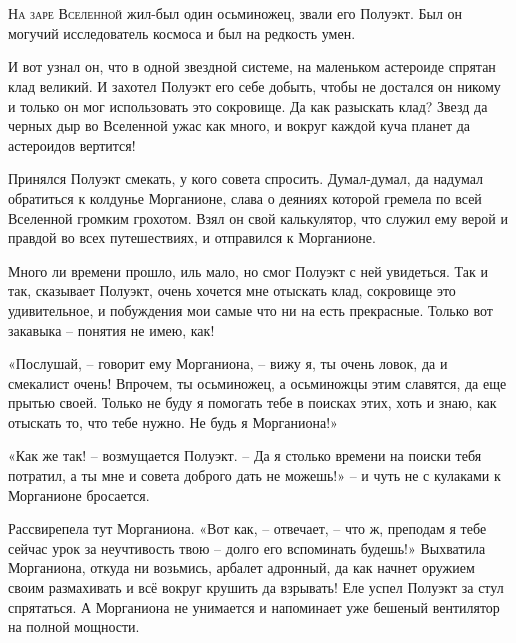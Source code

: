 \documentclass[ebook,oneside,final,openright]{memoir}
\begin{document}
\chapter{}
 \lettrine{Н}{а заре Вселенной} жил-был один осьминожец, звали его Полуэкт. Был он могучий исследователь космоса и был на редкость умен.\par
\par
И вот узнал он, что в одной звездной системе, на маленьком астероиде спрятан клад великий. И захотел Полуэкт его себе добыть, чтобы не достался он никому и только он мог использовать это сокровище. Да как разыскать клад? Звезд да черных дыр во Вселенной ужас как много, и вокруг каждой куча планет да астероидов вертится!\par
\par
Принялся Полуэкт смекать, у кого совета спросить. Думал-думал, да надумал обратиться к колдунье Морганионе, слава о деяниях которой гремела по всей Вселенной громким грохотом. Взял он свой калькулятор, что служил ему верой и правдой во всех путешествиях, и отправился к Морганионе.\par
\par
Много ли времени прошло, иль мало, но смог Полуэкт с ней увидеться. Так и так, сказывает Полуэкт, очень хочется мне отыскать клад, сокровище это удивительное, и побуждения мои самые что ни на есть прекрасные. Только вот закавыка – понятия не имею, как!\par
\par
«Послушай, – говорит ему Морганиона, – вижу я, ты очень ловок, да и смекалист очень! Впрочем, ты осьминожец, а осьминожцы этим славятся, да еще прытью своей. Только не буду я помогать тебе в поисках этих, хоть и знаю, как отыскать то, что тебе нужно. Не будь я Морганиона!» \par
\par
«Как же так! – возмущается Полуэкт. – Да я столько времени на поиски тебя потратил, а ты мне и совета доброго дать не можешь!» – и чуть не с кулаками к Морганионе бросается. \par
\par
Рассвирепела тут Морганиона. «Вот как, – отвечает, – что ж, преподам я тебе сейчас урок за неучтивость твою – долго его вспоминать будешь!» Выхватила Морганиона, откуда ни возьмись, арбалет адронный, да как начнет оружием своим размахивать и всё вокруг крушить да взрывать! Еле успел Полуэкт за стул спрятаться. А Морганиона не унимается и напоминает уже бешеный вентилятор на полной мощности. \par
\par
\end{document}
